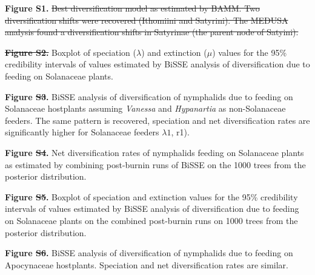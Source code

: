 \documentclass[10pt]{article}
\providecommand{\DIFaddtex}[1]{{\protect\color{blue}\uwave{#1}}} %
\providecommand{\DIFdeltex}[1]{{\protect\color{red}\sout{#1}}}                      %
\providecommand{\DIFaddbegin}{} %
\providecommand{\DIFaddend}{} %
\providecommand{\DIFdelbegin}{} %
\providecommand{\DIFdelend}{} %
\providecommand{\DIFadd}[1]{\texorpdfstring{\DIFaddtex{#1}}{#1}} %
\providecommand{\DIFdel}[1]{\texorpdfstring{\DIFdeltex{#1}}{}} %
\begin{document}
{\textbf{Figure S1.}} \DIFdelbegin \DIFdel{Best diversification model as estimated by BAMM.
Two diversification shifts were recovered (Ithomiini and Satyrini). The
MEDUSA analysis found a diversification shifts in Satyrinae (the parent
node of Satyini).
}%

\textbf{\DIFdel{Figure S2.}}%
\DIFdelend Boxplot of speciation (\(\lambda\)) and extinction
(\(\mu\)) values for the 95\% credibility intervals of values estimated
by BiSSE analysis of diversification due to feeding on Solanaceae
plants.

{\textbf{Figure \DIFdelbegin \DIFdel{S3}\DIFdelend \DIFaddbegin \DIFadd{S2}\DIFaddend .}} BiSSE analysis of diversification of nymphalids
due to feeding on Solanaceae hostplants assuming \emph{Vanessa} and
\emph{Hypanartia} as non-Solanaceae feeders. The same pattern is
recovered, speciation and net diversification rates are significantly
higher for Solanaceae feeders \(\lambda1\), r1).

{\textbf{Figure \DIFdelbegin \DIFdel{S4}\DIFdelend \DIFaddbegin \DIFadd{S3}\DIFaddend .}} Net diversification rates of nymphalids feeding on
Solanaceae plants as estimated by combining post-burnin runs of BiSSE on
the 1000 trees from the posterior distribution.

{\textbf{Figure \DIFdelbegin \DIFdel{S5}\DIFdelend \DIFaddbegin \DIFadd{S4}\DIFaddend .}} Boxplot of speciation and extinction values for
the 95\% credibility intervals of values estimated by BiSSE analysis of
diversification due to feeding on Solanaceae plants on the combined
post-burnin runs on 1000 trees from the posterior distribution.

{\textbf{Figure \DIFdelbegin \DIFdel{S6}\DIFdelend \DIFaddbegin \DIFadd{S5}\DIFaddend .}} BiSSE analysis of diversification of nymphalids
due to feeding on Apocynaceae hostplants. Speciation and net
diversification rates are similar.

\end{document}
